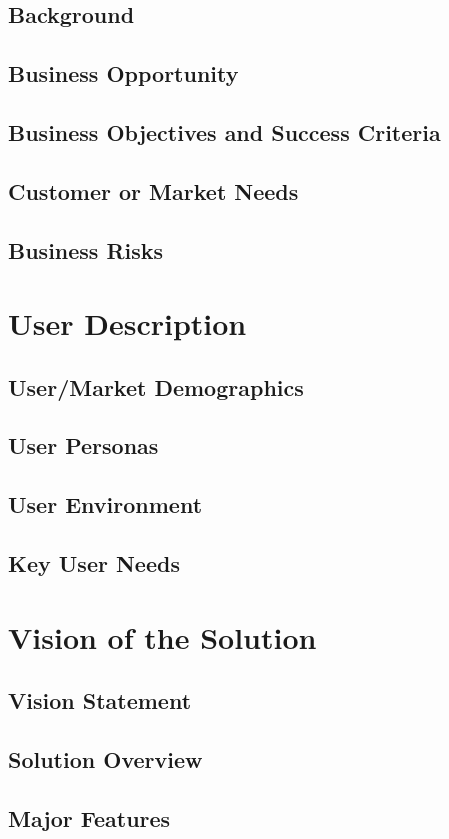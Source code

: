 \documentclass[12pt,oneside,letterpaper]{article}
\begin{document}
\subsection{Background}
\subsection{Business Opportunity}
\subsection{Business Objectives and Success Criteria}
\subsection{Customer or Market Needs}
\subsection{Business Risks}

\section{User Description}
\subsection{User/Market Demographics}
\subsection{User Personas}
\subsection{User Environment}
\subsection{Key User Needs}

\section{Vision of the Solution}
\subsection{Vision Statement}
\subsection{Solution Overview}
\subsection{Major Features}
\end{document}
